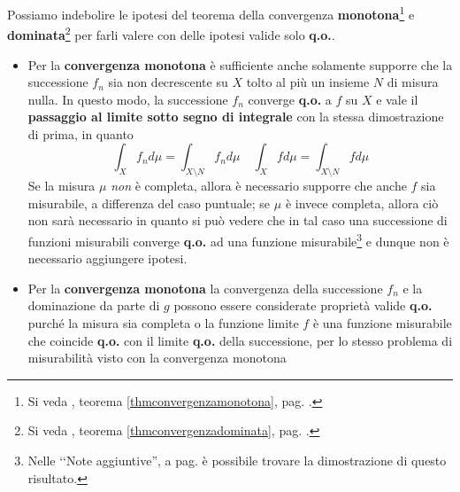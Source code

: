 \begin{observe}\label{indebolimentoteoremi}
	Possiamo indebolire le ipotesi del teorema della convergenza \textbf{monotona}\footnote{Si veda , teorema \ref{thmconvergenzamonotona}, pag. \pageref{thmconvergenzamonotona}.} e \textbf{dominata}\footnote{Si veda , teorema \ref{thmconvergenzadominata}, pag. \pageref{thmconvergenzadominata}.} per farli valere con delle ipotesi valide solo \textbf{q.o.}.
	\begin{itemize}
		\item Per la \textbf{convergenza monotona} è sufficiente anche solamente supporre che la successione $f_n$ sia non decrescente su $X$ tolto al più un insieme $N$ di misura nulla. In questo modo, la successione $f_n$ converge \textbf{q.o.} a $f$ su $X$ e vale il \textbf{passaggio al limite sotto segno di integrale} con la stessa dimostrazione di prima, in quanto
		\begin{equation*}
			\int_X f_nd\mu=\int_{X\setminus N}f_nd\mu\quad\int_X fd\mu=\int_{X\setminus N}fd\mu
		\end{equation*}
		Se la misura $\mu$ \textit{non} è completa, allora è necessario supporre che anche $f$ sia misurabile, a differenza del caso puntuale; se $\mu$ è invece completa, allora ciò non sarà necessario in quanto si può vedere che in tal caso una successione di funzioni misurabili converge \textbf{q.o.} ad una funzione misurabile\footnote{Nelle ‘‘Note aggiuntive'', a pag. \pageref{funzionimisurabiliqo} è possibile trovare la dimostrazione di questo risultato.} e dunque non è necessario aggiungere ipotesi.
		\item Per la \textbf{convergenza monotona} la convergenza della successione $f_n$ e la dominazione da parte di $g$ possono essere considerate proprietà valide \textbf{q.o.} purché la misura sia completa o la funzione limite $f$ è una funzione misurabile che coincide \textbf{q.o.} con il limite \textbf{q.o.} della successione, per lo stesso problema di misurabilità visto con la convergenza monotona  
	\end{itemize}
\end{observe}

